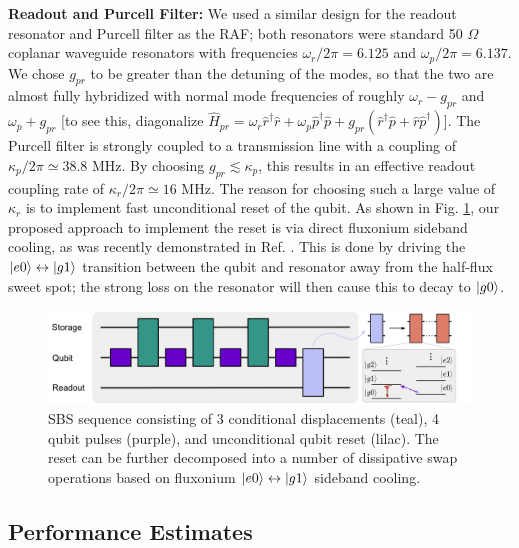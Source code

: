 \noindent \textbf{Readout and Purcell Filter:} We used a similar design for the readout resonator and Purcell filter as the RAF; both resonators were standard 50 $\Omega$ coplanar waveguide resonators with frequencies $\omega_r/2\pi = 6.125$ and $\omega_p/2\pi = 6.137$. We chose $g_{pr}$ to be greater than the detuning of the modes, so that the two are almost fully hybridized with normal mode frequencies of roughly $\omega_r - g_{pr}$ and $\omega_p + g_{pr}$ [to see this, diagonalize $\hat{H}_{pr} = \omega_r\hat{r}^\dagger \hat{r} + \omega_p\hat{p}^\dagger \hat{p} + g_{pr}(\hat{r}^\dagger\hat{p} + \hat{r}\hat{p}^\dagger)$]. The Purcell filter is strongly coupled to a transmission line with a coupling of $\kappa_p/2\pi \simeq 38.8$ MHz. By choosing $g_{pr} \lesssim \kappa_p$, this results in an effective readout coupling rate of $\kappa_r/2\pi \simeq 16$ MHz. The reason for choosing such a large value of $\kappa_r$ is to implement fast unconditional reset of the qubit. As shown in Fig. \ref{fig:5_SBS_Sideband_Reset}, our proposed approach to implement the reset is via direct fluxonium sideband cooling, as was recently demonstrated in Ref. \cite{najera2024high}. This is done by driving the $\lvert e0\rangle\leftrightarrow\lvert g1\rangle$ transition between the qubit and resonator away from the half-flux sweet spot; the strong loss on the resonator will then cause this to decay to $\lvert g0\rangle$. 
\begin{figure}[h]
    \centering
 \includegraphics[width=\linewidth]{Figures/5/SBS_Sideband_Reset.pdf}
    \caption{SBS sequence consisting of 3 conditional displacements (teal), 4 qubit pulses (purple),  and unconditional qubit reset (lilac). The reset can be further decomposed into a number of dissipative swap operations based on fluxonium $\lvert e0\rangle\leftrightarrow\lvert g1\rangle$ sideband cooling.}
    \label{fig:5_SBS_Sideband_Reset}
\end{figure}

\clearpage
\subsection{Performance Estimates}

